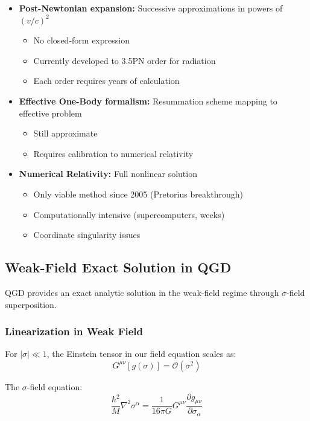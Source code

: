 \documentclass[11pt,a4paper]{article}
\theoremstyle{definition}
\theoremstyle{remark}
\begin{document}
	\begin{itemize}
		\item \textbf{Post-Newtonian expansion:} Successive approximations in powers of $(v/c)^2$
		\begin{itemize}
			\item No closed-form expression
			\item Currently developed to 3.5PN order for radiation
			\item Each order requires years of calculation
		\end{itemize}
		
		\item \textbf{Effective One-Body formalism:} Resummation scheme mapping to effective problem
		\begin{itemize}
			\item Still approximate
			\item Requires calibration to numerical relativity
		\end{itemize}
		
		\item \textbf{Numerical Relativity:} Full nonlinear solution
		\begin{itemize}
			\item Only viable method since 2005 (Pretorius breakthrough)
			\item Computationally intensive (supercomputers, weeks)
			\item Coordinate singularity issues
		\end{itemize}
	\end{itemize}
	
	\subsection{Weak-Field Exact Solution in QGD}
	
	QGD provides an exact analytic solution in the weak-field regime through $\sigma$-field superposition.
	
	\subsubsection{Linearization in Weak Field}
	
	For $|\sigma| \ll 1$, the Einstein tensor in our field equation scales as:
	\begin{equation}
		G^{\mu\nu}[g(\sigma)] = \mathcal{O}(\sigma^2)
	\end{equation}
	
	The $\sigma$-field equation:
	\begin{equation}
		\frac{\hbar^2}{M}\nabla^2\sigma^\alpha = \frac{1}{16\pi G}G^{\mu\nu}\frac{\partial g_{\mu\nu}}{\partial \sigma_\alpha}
	\end{equation}
	
\end{document}

